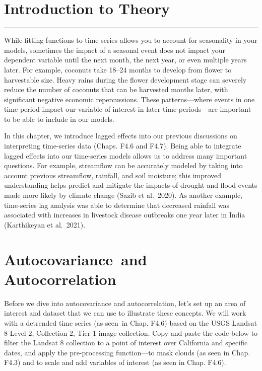 \documentclass[
  letterpaper,
  DIV=11,
  numbers=noendperiod]{scrreprt}
\begin{document}
\hypertarget{introduction-to-theory-11}{%
\section*{Introduction to Theory}\label{introduction-to-theory-11}}


\begin{center}\rule{0.5\linewidth}{0.5pt}\end{center}

While fitting functions to time series allows you to account for
seasonality in your models, sometimes the impact of a seasonal event
does not impact your dependent variable until the next month, the next
year, or even multiple years later. For example, coconuts take 18--24
months to develop from flower to harvestable size. Heavy rains during
the flower development stage can severely reduce the number of coconuts
that can be harvested months later, with significant negative economic
repercussions. These patterns---where events in one time period impact
our variable of interest in later time periods---are important to be
able to include in our models.

In this chapter, we introduce lagged effects into our previous
discussions on interpreting time-series data (Chaps. F4.6 and F4.7).
Being able to integrate lagged effects into our time-series models
allows us to address many important questions. For example, streamflow
can be accurately modeled by taking into account previous streamflow,
rainfall, and soil moisture; this improved understanding helps predict
and mitigate the impacts of drought and flood events made more likely by
climate change (Sazib et al.~2020). As another example, time-series lag
analysis was able to determine that decreased rainfall was associated
with increases in livestock disease outbreaks one year later in India
(Karthikeyan et al.~2021).

\hypertarget{autocovariance-and-autocorrelation}{%
\section{Autocovariance~and
Autocorrelation}\label{autocovariance-and-autocorrelation}}

Before we dive into autocovariance and autocorrelation, let's set up an
area of interest and dataset that we can use to illustrate these
concepts. We will work with a detrended time series (as seen~in Chap.
F4.6) based on the USGS Landsat 8 Level 2, Collection 2, Tier 1 image
collection. Copy and paste the code below to filter the Landsat 8
collection to a point of interest over California and specific dates,
and apply the pre-processing function---to mask clouds (as seen in Chap.
F4.3) and to scale and add variables of interest (as seen in Chap.
F4.6).
\end{document}
